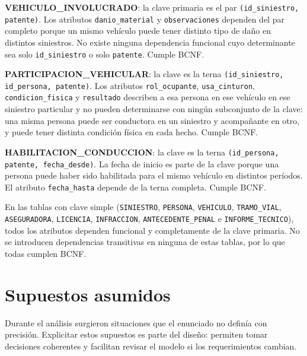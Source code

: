 \documentclass[12pt,a4paper]{article}
\begin{document}
\textbf{VEHICULO\_INVOLUCRADO}: la clave primaria es el par \texttt{(id\_siniestro, patente)}. Los atributos \texttt{danio\_material} y \texttt{observaciones} dependen del par completo porque un mismo vehículo puede tener distinto tipo de daño en distintos siniestros. No existe ninguna dependencia funcional cuyo determinante sea solo \texttt{id\_siniestro} o solo \texttt{patente}. Cumple BCNF.

\textbf{PARTICIPACION\_VEHICULAR}: la clave es la terna \texttt{(id\_siniestro, id\_persona, patente)}. Los atributos \texttt{rol\_ocupante}, \texttt{usa\_cinturon}, \texttt{condicion\_fisica} y \texttt{resultado} describen a esa persona en ese vehículo en ese siniestro particular y no pueden determinarse con ningún subconjunto de la clave: una misma persona puede ser conductora en un siniestro y acompañante en otro, y puede tener distinta condición física en cada hecho. Cumple BCNF.

\textbf{HABILITACION\_CONDUCCION}: la clave es la terna \texttt{(id\_persona, patente, fecha\_desde)}. La fecha de inicio es parte de la clave porque una persona puede haber sido habilitada para el mismo vehículo en distintos períodos. El atributo \texttt{fecha\_hasta} depende de la terna completa. Cumple BCNF.

En las tablas con clave simple (\texttt{SINIESTRO}, \texttt{PERSONA}, \texttt{VEHICULO}, \texttt{TRAMO\_VIAL}, \texttt{ASEGURADORA}, \texttt{LICENCIA}, \texttt{INFRACCION}, \texttt{ANTECEDENTE\_PENAL} e \texttt{INFORME\_TECNICO}), todos los atributos dependen funcional y completamente de la clave primaria. No se introducen dependencias transitivas en ninguna de estas tablas, por lo que todas cumplen BCNF.

\section{Supuestos asumidos}

Durante el análisis surgieron situaciones que el enunciado no definía con precisión. Explicitar estos supuestos es parte del diseño: permiten tomar decisiones coherentes y facilitan revisar el modelo si los requerimientos cambian.
\end{document}
